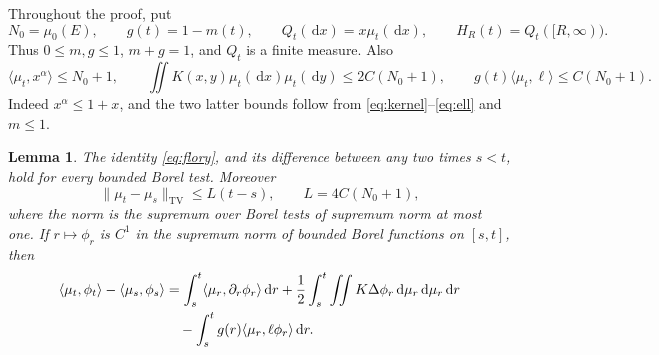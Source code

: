 \documentclass[11pt]{article}
\newtheorem{lemma}[theorem]{Lemma}
\newcommand{\pair}[2]{\langle #1,#2\rangle}
\newcommand{\dd}{\,\mathrm{d}}
\DeclareMathOperator{\TV}{TV}
\begin{document}
Throughout the proof, put
\[
 N_0=\mu_0(E),\qquad g(t)=1-m(t),\qquad Q_t(\dd x)=x\mu_t(\dd x),
 \qquad H_R(t)=Q_t([R,\infty)).
\]
Thus $0\le m,g\le1$, $m+g=1$, and $Q_t$ is a finite measure. Also
\begin{equation}\label{eq:rates}
 \pair{\mu_t}{x^\alpha}\le N_0+1,\qquad
 \iint K(x,y)\mu_t(\dd x)\mu_t(\dd y)\le2C(N_0+1),\qquad
 g(t)\pair{\mu_t}{\ell}\le C(N_0+1).
\end{equation}
Indeed $x^\alpha\le1+x$, and the two latter bounds follow from \eqref{eq:kernel}--\eqref{eq:ell} and $m\le1$.

\begin{lemma}\label{lem:tests}
The identity \eqref{eq:flory}, and its difference between any two times $s<t$, hold for every bounded Borel test. Moreover
\begin{equation}\label{eq:tv}
 \|\mu_t-\mu_s\|_{\TV}\le L(t-s),\qquad L=4C(N_0+1),
\end{equation}
where the norm is the supremum over Borel tests of supremum norm at most one. If $r\mapsto\phi_r$ is $C^1$ in the supremum norm of bounded Borel functions on $[s,t]$, then
\begin{align}
 \pair{\mu_t}{\phi_t}-\pair{\mu_s}{\phi_s}
 &=\int_s^t\pair{\mu_r}{\partial_r\phi_r}\dd r
 +\frac12\int_s^t\iint K\Delta\phi_r\dd\mu_r\dd\mu_r\dd r\notag\\
 &\quad-\int_s^t g(r)\pair{\mu_r}{\ell\phi_r}\dd r.
 \label{eq:time-tests}
\end{align}
\end{lemma}
\end{document}
